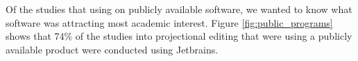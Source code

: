 Of the studies that using on publicly available software, we wanted to know what software was attracting most academic interest.
Figure \ref{fig:public_programs} shows that 74\% of the studies into projectional editing that were using a publicly available product were conducted using Jetbrains.

\begin{figure}
    \centering
\end{figure}

